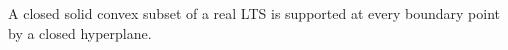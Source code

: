A closed solid convex subset of a real LTS is supported at every boundary point by a closed hyperplane.